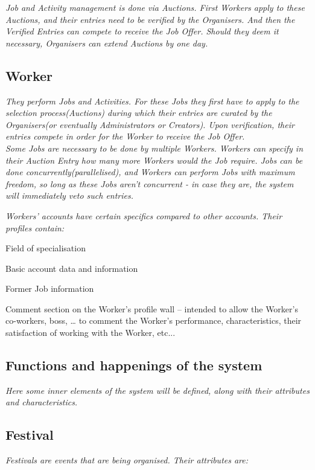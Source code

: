		\textit{Job and Activity management is done via Auctions. First Workers apply to these Auctions, and their entries need to be verified by the Organisers. And then the Verified Entries can compete to receive the Job Offer. Should they deem it necessary, Organisers can extend Auctions by one day.}
		
		\subsection{Worker}
		\textit{They perform Jobs and Activities. For these Jobs they first have to apply to the selection process(Auctions) during which their entries are curated by the Organisers(or eventually Administrators or Creators). Upon verification, their entries compete in order for the Worker to receive the Job Offer.}\\
		
		\textit{Some Jobs are necessary to be done by multiple Workers. Workers can specify in their Auction Entry how many more Workers would the Job require. Jobs can be done concurrently(parallelised), and Workers can perform Jobs with maximum freedom, so long as these Jobs aren't concurrent - in case they are, the system will immediately veto such entries.}
		
		\textit{Workers' accounts have certain specifics compared to other accounts. Their profiles contain:}
		\begin{packed_enum}
			\item Field of specialisation
			\item Basic account data and information
			\item Former Job information
			\item Comment section on the Worker’s profile wall – intended to allow the Worker’s co-workers, boss, … to comment the Worker’s performance, characteristics, their satisfaction of working with the Worker, etc...
		\end{packed_enum}
		
	\subsection{Functions and happenings of the system}
	\textit{Here some inner elements of the system will be defined, along with their attributes and characteristics.}
		\subsection{Festival}
		\textit{Festivals are events that are being organised. Their attributes are:}\\
		
